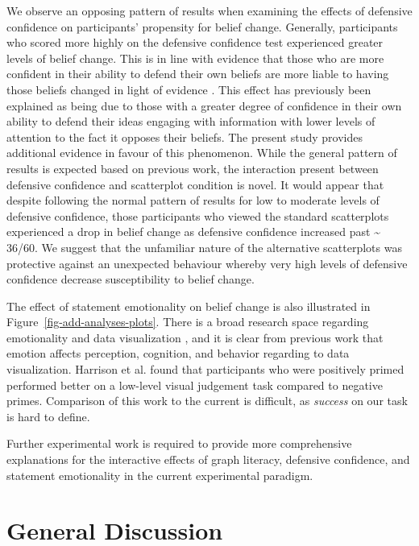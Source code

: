 \documentclass[manuscript,screen,review,anonymous]{acmart}
\begin{document}
We observe an opposing pattern of results when examining the effects of
defensive confidence on participants' propensity for belief change.
Generally, participants who scored more highly on the defensive
confidence test experienced greater levels of belief change. This is in
line with evidence that those who are more confident in their ability to
defend their own beliefs are more liable to having those beliefs changed
in light of evidence \citep{albarracin_2004}. This effect has previously
been explained as being due to those with a greater degree of confidence
in their own ability to defend their ideas engaging with information
with lower levels of attention to the fact it opposes their beliefs. The
present study provides additional evidence in favour of this phenomenon.
While the general pattern of results is expected based on previous work,
the interaction present between defensive confidence and scatterplot
condition is novel. It would appear that despite following the normal
pattern of results for low to moderate levels of defensive confidence,
those participants who viewed the standard scatterplots experienced a
drop in belief change as defensive confidence increased past
\textasciitilde{} 36/60. We suggest that the unfamiliar nature of the
alternative scatterplots was protective against an unexpected behaviour
whereby very high levels of defensive confidence decrease susceptibility
to belief change.

The effect of statement emotionality on belief change is also
illustrated in Figure~\ref{fig-add-analyses-plots}. There is a broad
research space regarding emotionality and data visualization
\citep{lan_2023}, and it is clear from previous work that emotion
affects perception, cognition, and behavior
\citep{phelps_2006, harrison_2013, thoresen_2016} regarding to data
visualization. Harrison et al. \citep{harrison_2013} found that
participants who were positively primed performed better on a low-level
visual judgement task compared to negative primes. Comparison of this
work to the current is difficult, as \emph{success} on our task is hard
to define.

Further experimental work is required to provide more comprehensive
explanations for the interactive effects of graph literacy, defensive
confidence, and statement emotionality in the current experimental
paradigm.

\section{General Discussion}\label{sec-general-discussion}
\end{document}
